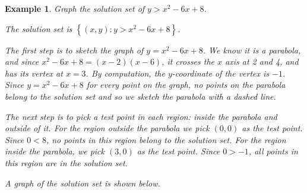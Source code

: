 \documentclass[11pt]{book}               %
\newtheorem{example}{Example}
\begin{document}
\begin{example}
Graph the solution set of $y > x^2 -6x + 8$.

\normalfont
The solution set is $\left\{(x, y): y > x^2 -6x + 8 \right\}$.

The first step is to sketch the graph of $y = x^2 -6x + 8$.
We know it is a parabola, and since $ x^2 -6x + 8 = (x-2)(x-6)$,
it crosses the $x$ axis at 2 and 4, and has its vertex at $x=3$.
By computation, the $y$-coordinate of the vertex is $-1$.
Since $y = x^2 -6x + 8$ for every point on the graph, no points on
the parabola belong to the solution set and so we sketch the parabola with a dashed line.

The next step is to pick a test point in each region: inside the parabola and outside of it.
For the region outside the parabola we pick $(0, 0)$ as the test point.
Since $0 < 8$, no points in this region belong to the solution set.
For the region inside the parabola, we pick $(3, 0)$ as the test point.
Since $0 > -1$, all points in this region are in the solution set.

A graph of the solution set is shown below.

\begin{center}
\\

\end{center}
\end{example}
\end{document}

